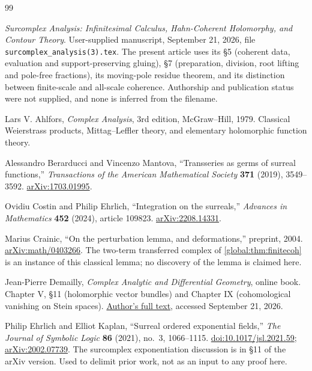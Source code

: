 \documentclass[11pt,letterpaper]{article}
\theoremstyle{definition}
\theoremstyle{remark}
\numberwithin{equation}{section}
\begin{document}
\begin{thebibliography}{99}

\emph{Surcomplex Analysis: Infinitesimal Calculus, Hahn-Coherent Holomorphy, and Contour Theory}.
User-supplied manuscript, September 21, 2026, file \texttt{surcomplex\_analysis(3).tex}.
The present article uses its \S5 (coherent data, evaluation and support-preserving gluing), \S7 (preparation, division, root lifting and pole-free fractions), its moving-pole residue theorem, and its distinction between finite-scale and all-scale coherence. Authorship and publication status were not supplied, and none is inferred from the filename.

Lars V. Ahlfors, \emph{Complex Analysis}, 3rd edition, McGraw--Hill, 1979.
Classical Weierstrass products, Mittag--Leffler theory, and elementary holomorphic function theory.

Alessandro Berarducci and Vincenzo Mantova,
``Transseries as germs of surreal functions,''
\emph{Transactions of the American Mathematical Society} \textbf{371} (2019), 3549--3592.
\href{https://arxiv.org/abs/1703.01995}{arXiv:1703.01995}.

Ovidiu Costin and Philip Ehrlich,
``Integration on the surreals,''
\emph{Advances in Mathematics} \textbf{452} (2024), article 109823.
\href{https://arxiv.org/abs/2208.14331}{arXiv:2208.14331}.

Marius Crainic, ``On the perturbation lemma, and deformations,''
preprint, 2004.
\href{https://arxiv.org/abs/math/0403266}{arXiv:math/0403266}.
The two-term transferred complex of \cref{global:thm:finitecoh} is an instance of this classical lemma; no discovery of the lemma is claimed here.

Jean-Pierre Demailly, \emph{Complex Analytic and Differential Geometry}, online book.
Chapter V, \S11 (holomorphic vector bundles) and Chapter IX (cohomological vanishing on Stein spaces).
\href{https://www-fourier.univ-grenoble-alpes.fr/~demailly/manuscripts/agbook.pdf}{Author's full text}, accessed September 21, 2026.

Philip Ehrlich and Elliot Kaplan,
``Surreal ordered exponential fields,''
\emph{The Journal of Symbolic Logic} \textbf{86} (2021), no.~3, 1066--1115.
\href{https://doi.org/10.1017/jsl.2021.59}{doi:10.1017/jsl.2021.59};
\href{https://arxiv.org/abs/2002.07739}{arXiv:2002.07739}.
The surcomplex exponentiation discussion is in \S11 of the arXiv version. Used to delimit prior work, not as an input to any proof here.


\end{thebibliography}
\end{document}
